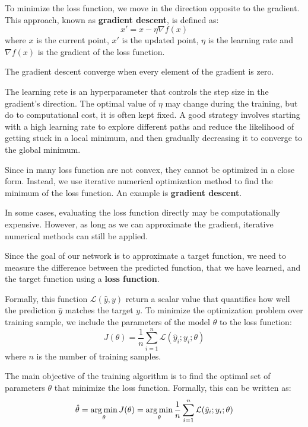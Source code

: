 To minimize the loss function, we move in the direction opposite to the gradient.
This approach, known as \textbf{gradient descent}, is defined as:
\begin{equation}
    x' = x - \eta \nabla f(x)
\end{equation}
where $x$ is the current point, $x'$ is the updated point, $\eta$ is the learning
rate and $\nabla f(x)$ is the gradient of the loss function.

\begin{note}
    The gradient descent converge when every element of the gradient is zero.
\end{note}

The learning rete is an hyperparameter that controls the step size in the gradient's
direction. The optimal value of $\eta$ may change during the training, but do to
computational cost, it is often kept fixed. A good strategy involves starting with
a high learning rate to explore different paths and reduce the likelihood of
getting stuck in a local minimum, and then gradually decreasing it to converge
to the global minimum.

Since in many loss function are not convex, they cannot be optimized in a close
form. Instead, we use iterative numerical optimization method to find the minimum
of the loss function. An example is \textbf{gradient descent}.

In some cases, evaluating the loss function directly may be computationally
expensive. However, as long as we can approximate the gradient, iterative
numerical methods can still be applied.

Since the goal of our network is to approximate a target function, we need to
measure the difference between the predicted function, that we have learned, and
the target function using a \textbf{loss function}.

Formally, this function $\mathcal{L}(\hat{y}, y)$ return a scalar value that
quantifies how well the prediction $\hat{y}$ matches the target $y$. To minimize
the optimization problem over training sample, we include the parameters of the
model $\theta$ to the loss function:
\begin{equation}
    J(\theta) = \frac{1}{n} \sum_{i=1}^n \mathcal{L}(\hat{y}_i; y_i; \theta)
\end{equation}
where $n$ is the number of training samples.

The main objective of the training algorithm is to find the optimal set of
parameters $\theta$ that minimize the loss function. Formally, this can be written
as:
\begin{equation}
    \hat{\theta} = \operatorname*{arg\,min}_{\theta} J(\theta) = \operatorname*{arg\,min}_{\theta} \frac{1}{n}
    \sum_{i=1}^n \mathcal{L}(\hat{y}_i; y_i; \theta)
\end{equation}

